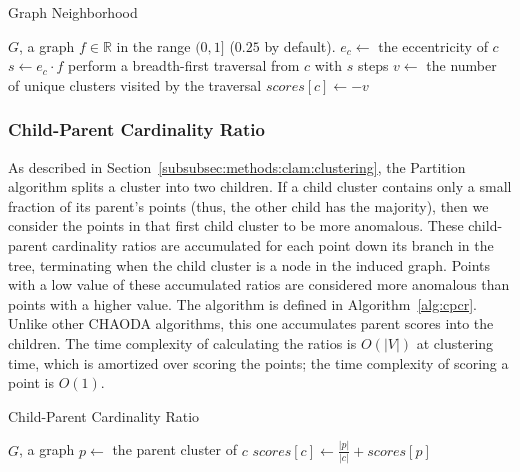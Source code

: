 \begin{algorithm}[h]
    \caption{Graph Neighborhood}
    \label{alg:gns}
\begin{algorithmic}[1]
    \REQUIRE $G$, a graph
    \REQUIRE $f \in \mathbb{R}$ in the range $(0,1]$ ($0.25$ by default).
        \STATE $e_c \gets$ the eccentricity of $c$
        \STATE $s \gets e_c \cdot f$
        \STATE perform a breadth-first traversal from $c$ with $s$ steps
        \STATE $v \gets$ the number of unique clusters visited by the traversal
        \STATE $scores[c] \gets -v$
    \ENDFOR
\end{algorithmic}
\end{algorithm}

\subsubsection{Child-Parent Cardinality Ratio}
\label{subsubsec:methods:individual-algorithms:cpcr}
As described in Section~\ref{subsubsec:methods:clam:clustering}, the Partition algorithm splits a cluster into two children.
If a child cluster contains only a small fraction of its parent's points (thus, the other child has the majority), then we consider the points in that first child cluster to be more anomalous.
These child-parent cardinality ratios are accumulated for each point down its branch in the tree, terminating when the child cluster is a node in the induced graph.
Points with a low value of these accumulated ratios are considered more anomalous than points with a higher value.
The algorithm is defined in Algorithm~\ref{alg:cpcr}.
Unlike other CHAODA algorithms, this one accumulates parent scores into the children.
The time complexity of calculating the ratios is $O(|V|)$ at clustering time, which is amortized over scoring the points;
the time complexity of scoring a point is $O(1)$.

\begin{algorithm}[h]
    \caption{Child-Parent Cardinality Ratio}
    \label{alg:cpcr}
\begin{algorithmic}[1]
    \REQUIRE $G$, a graph
        \STATE $p \gets$ the parent cluster of $c$
        \STATE $scores[c] \gets \frac{|p|}{|c|} + scores[p]$
    \ENDFOR
\end{algorithmic}
\end{algorithm}

